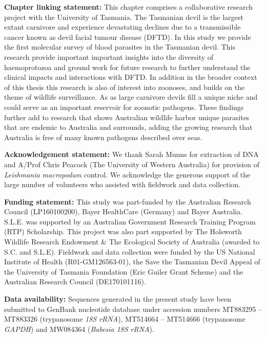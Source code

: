 \documentclass[a4paper, nobind]{templates/ociamthesis}
\begin{document}
\newpage

\textbf{Chapter linking statement:}
This chapter comprises a collaborative research project with the University of Tasmania. The Tasmanian devil is the largest extant carnivore and experience devastating declines due to a transmissible cancer known as devil facial tumour disease (DFTD). In this study we provide the first molecular survey of blood parasites in the Tasmanian devil. This research provide important important insights into the diversity of haemoprotozoa and ground work for future research to further understand the clinical impacts and interactions with DFTD. In addition in the broader context of this thesis this research is also of interest into zoonoses, and builds on the theme of wildlife surveillance. As as large carnivore devils fill a unique niche and could serve as an important reservoir for zoonotic pathogens. These findings further add to research that shows Australian wildlife harbor unique parasites that are endemic to Australia and surrounds, adding the growing research that Australia is free of many known pathogens described over seas.

\vspace{5mm}

\textbf{Acknowledgement statement:}
We thank Sarah Munns for extraction of DNA and A/Prof Chris Peacock (The University of Western Australia) for provision of \emph{Leishmania macropodum} control. We acknowledge the generous support of the large number of volunteers who assisted with fieldwork and data collection.

\vspace{5mm}

\textbf{Funding statement:} This study was part-funded by the Australian Research Council (LP160100200), Bayer HealthCare (Germany) and Bayer Australia. S.L.E. was supported by an Australian Government Research Training Program (RTP) Scholarship. This project was also part supported by The Holsworth Wildlife Research Endowment \& The Ecological Society of Australia (awarded to S.C. and S.L.E). Fieldwork and data collection were funded by the US National Institute of Health (R01-GM126563-01), the Save the Tasmanian Devil Appeal of the University of Tasmania Foundation (Eric Guiler Grant Scheme) and the Australian Research Council (DE170101116).

\vspace{5mm}

\textbf{Data availability:} Sequences generated in the present study have been submitted to GenBank nucleotide database under accession numbers MT883295 -- MT883326 (trypanosome \emph{18S rRNA}), MT514664 -- MT514666 (trypanosome \emph{GAPDH}) and MW084364 (\emph{Babesia} \emph{18S rRNA}).
\end{document}
